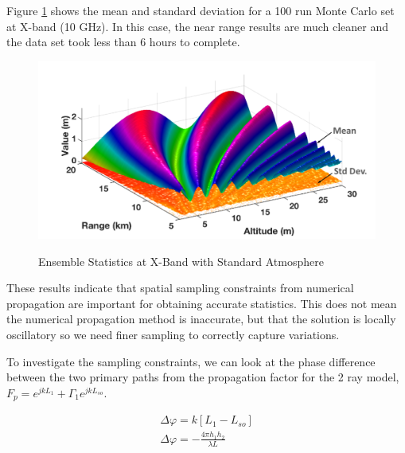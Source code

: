 Figure \ref{stat_fig:2} shows the mean and standard deviation for a 100 run Monte Carlo set at X-band (10 GHz). In this case, the near range results are much cleaner and the data set took less than 6 hours to complete.
\begin{figure}[H]
  \begin{center}
\includegraphics[width=5in]{../media/statistics/x_band_stats.png}
  \end{center}
  \renewcommand{\baselinestretch}{1} \small\normalsize
  \begin{quote}
    \caption[Ensemble Statistics at X-Band with Standard Atmosphere]{Ensemble Statistics at X-Band with Standard Atmosphere\label{stat_fig:2}}
  \end{quote}
\end{figure}
\renewcommand{\baselinestretch}{2} \small\normalsize

These results indicate that spatial sampling constraints from numerical propagation are important for obtaining accurate statistics. This does not mean the numerical propagation method is inaccurate, but that the solution is locally oscillatory so we need finer sampling to correctly capture variations.

To investigate the sampling constraints, we can look at the phase difference between the two primary paths from the propagation factor for the 2 ray model, $F_p = e^{jkL_1} + \Gamma_1e^{jkL_{so}}$. 

\begin{equation}
\begin{gathered}
\Delta\varphi = k\left[ L_1 - L_{so}\right] \\
\Delta\varphi = -\frac{4\pi h_1h_2}{\lambda L}
\label{stat_eq:1}
\end{gathered}
\end{equation}
\renewcommand{\baselinestretch}{2} \small\normalsize

